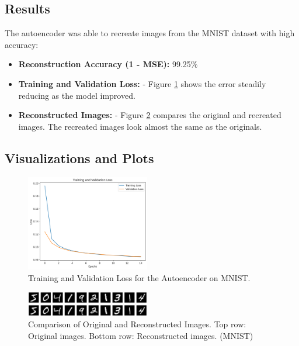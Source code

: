 \documentclass[lettersize,journal]{IEEEtran}
\begin{document}
\subsection{\textbf{Results}}
The autoencoder was able to recreate images from the MNIST dataset with high accuracy:
\begin{itemize}
    \item \textbf{Reconstruction Accuracy (1 - MSE):} 99.25\%
    \item \textbf{Training and Validation Loss:} 
    - Figure \ref{fig:training-loss} shows the error steadily reducing as the model improved.
    \item \textbf{Reconstructed Images:} 
    - Figure \ref{fig:autoencoder-results} compares the original and recreated images. The recreated images look almost the same as the originals.
\end{itemize}

\subsection{\textbf{Visualizations and Plots}}

\begin{figure}[H]
    \centering
    \includegraphics[width=0.48\textwidth]{mnist_training_loss.png}
    \caption{Training and Validation Loss for the Autoencoder on MNIST.}
    \label{fig:training-loss}
\end{figure}

\begin{figure}[H]
    \centering
    \includegraphics[width=0.48\textwidth]{autoencoder_results.png}
    \caption{Comparison of Original and Reconstructed Images. Top row: Original images. Bottom row: Reconstructed images. (MNIST)}
    \label{fig:autoencoder-results}
\end{figure}
\end{document}
